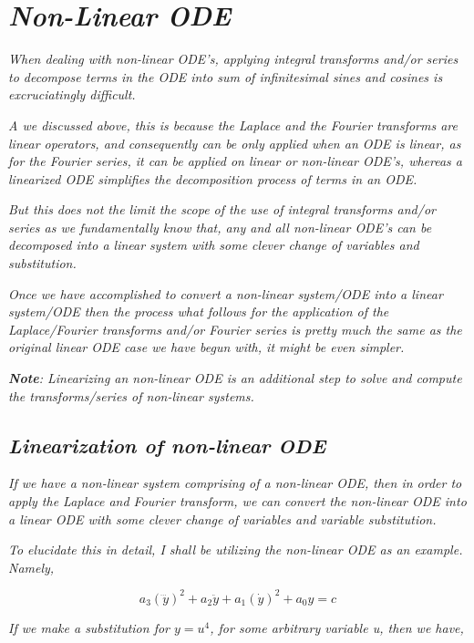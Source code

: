 

\section{\textit{Non-Linear ODE}}

	\textit{When dealing with non-linear ODE's, applying integral transforms and/or series to decompose terms in the ODE into sum of infinitesimal sines and cosines is excruciatingly difficult.}

	\textit{A we discussed above, this is because the Laplace and the Fourier transforms are linear operators, and consequently can be only applied when an ODE is linear, as for the Fourier series, it can be applied on linear or non-linear ODE's, whereas a linearized ODE simplifies the decomposition process of terms in an ODE.}

	\textit{But this does not the limit the scope of the use of integral transforms and/or series as we fundamentally know that, any and all non-linear ODE's can be decomposed into a linear system with some clever change of variables and substitution.}

	\textit{Once we have accomplished to convert a non-linear system/ODE into a linear system/ODE then the process what follows for the application of the Laplace/Fourier transforms and/or Fourier series is pretty much the same as the original linear ODE case we have begun with, it might be even simpler.}

	\textit{\textbf{Note}: Linearizing an non-linear ODE is an additional step to solve and compute the transforms/series of non-linear systems.}

	\subsection{\textit{Linearization of non-linear ODE}}
		
		\textit{If we have a non-linear system comprising of a non-linear ODE, then in order to apply the Laplace and Fourier transform, we can convert the non-linear ODE into a linear ODE with some clever change of variables and variable substitution.}		
		
		\textit{To elucidate this in detail, I shall be utilizing the non-linear ODE as an example. Namely,}		
		
			$$a_3\left(\dddot{y}\right)^2 + a_2\ddot{y} + a_1\left(\dot{y}\right)^2 + a_0y = c$$		
		
		\textit{If we make a substitution for $y = u^4$, for some arbitrary variable u, then we have,}		
		
